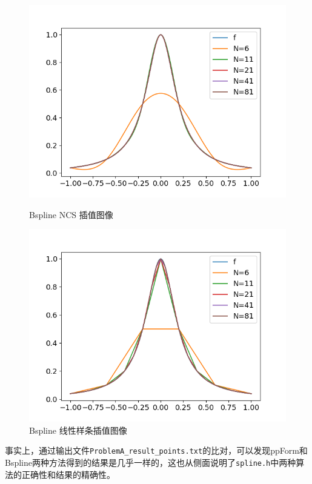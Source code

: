 \documentclass{ctexart}
\begin{document}
\begin{sloppypar}
\begin{figure}[H]
  \begin{minipage}[t]{0.5\linewidth}
    \centering
    \includegraphics[scale = 0.45]{fig//ProblemA_Bspline_33.png}
    \caption{Bspline NCS 插值图像}
  \end{minipage}
  \begin{minipage}[t]{0.5\linewidth}
    \centering
    \includegraphics[scale = 0.45]{fig//ProblemA_Bspline_1.png}
    \caption{Bspline 线性样条插值图像}
  \end{minipage}
  \label{fig5}
\end{figure}
事实上，通过输出文件\verb|ProblemA_result_points.txt|的比对，可以发现ppForm和Bspline两种方法得到的结果是几乎一样的，这也从侧面说明了\verb|spline.h|中两种算法的正确性和结果的精确性。


\end{sloppypar}
\end{document}
